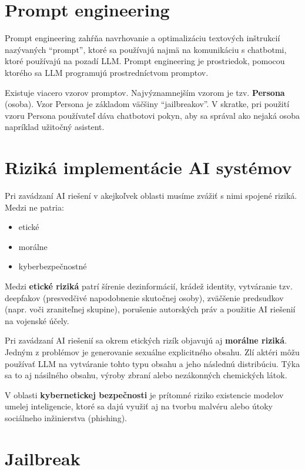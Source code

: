 \section*{Prompt engineering \label{sec:prompt_engineering_resume}}

Prompt engineering zahŕňa navrhovanie a optimalizáciu textových inštrukcií nazývaných ``prompt'', ktoré sa používajú najmä na komunikáciu s chatbotmi, ktoré používajú na pozadí LLM. Prompt engineering je prostriedok, pomocou ktorého sa LLM programujú prostredníctvom promptov.

Existuje viacero vzorov promptov. Najvýznamnejším vzorom je tzv. \textbf{Persona} (osoba). Vzor Persona je základom väčšiny ``jailbreakov''. V skratke, pri použití vzoru Persona používateľ dáva chatbotovi pokyn, aby sa správal ako nejaká osoba napríklad užitočný asistent.

\section*{Riziká implementácie AI systémov \label{sec:ai_risks_resume}}

Pri zavádzaní AI riešení v akejkoľvek oblasti musíme zvážiť s nimi spojené riziká. Medzi ne patria:

\begin{itemize}
    \item etické
    \item morálne
    \item kyberbezpečnostné
\end{itemize}

Medzi \textbf{etické riziká} patrí šírenie dezinformácií, krádež identity, vytváranie tzv. deepfakov (presvedčivé napodobnenie skutočnej osoby), zväčšenie predsudkov (napr. voči zraniteľnej skupine), porušenie autorských práv a použitie AI riešenií na vojenské účely.

Pri zavádzaní AI riešenií sa okrem etických rizík objavujú aj \textbf{morálne riziká}. Jedným z problémov je generovanie sexuálne explicitného obsahu. Zlí aktéri môžu používať LLM na vytváranie tohto typu obsahu a jeho následnú distribúciu. Týka sa to aj násilného obsahu, výroby zbraní alebo nezákonných chemických látok.

V oblasti \textbf{kybernetickej bezpečnosti} je prítomné riziko existencie modelov umelej inteligencie, ktoré sa dajú využiť aj na tvorbu malvéru alebo útoky sociálneho inžinierstva (phishing).

\section*{Jailbreak \label{sec:jailbreak_resume}}

